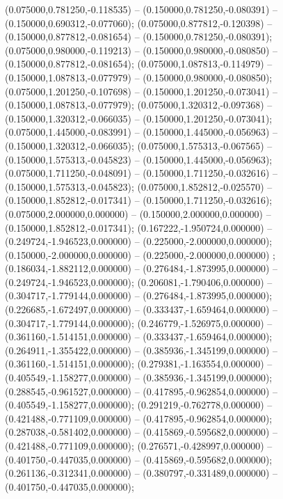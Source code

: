  (0.075000,0.781250,-0.118535) -- (0.150000,0.781250,-0.080391) -- (0.150000,0.690312,-0.077060);
 (0.075000,0.877812,-0.120398) -- (0.150000,0.877812,-0.081654) -- (0.150000,0.781250,-0.080391);
 (0.075000,0.980000,-0.119213) -- (0.150000,0.980000,-0.080850) -- (0.150000,0.877812,-0.081654);
 (0.075000,1.087813,-0.114979) -- (0.150000,1.087813,-0.077979) -- (0.150000,0.980000,-0.080850);
 (0.075000,1.201250,-0.107698) -- (0.150000,1.201250,-0.073041) -- (0.150000,1.087813,-0.077979);
 (0.075000,1.320312,-0.097368) -- (0.150000,1.320312,-0.066035) -- (0.150000,1.201250,-0.073041);
 (0.075000,1.445000,-0.083991) -- (0.150000,1.445000,-0.056963) -- (0.150000,1.320312,-0.066035);
 (0.075000,1.575313,-0.067565) -- (0.150000,1.575313,-0.045823) -- (0.150000,1.445000,-0.056963);
 (0.075000,1.711250,-0.048091) -- (0.150000,1.711250,-0.032616) -- (0.150000,1.575313,-0.045823);
 (0.075000,1.852812,-0.025570) -- (0.150000,1.852812,-0.017341) -- (0.150000,1.711250,-0.032616);
 (0.075000,2.000000,0.000000) -- (0.150000,2.000000,0.000000) -- (0.150000,1.852812,-0.017341);
 (0.167222,-1.950724,0.000000) -- (0.249724,-1.946523,0.000000) -- (0.225000,-2.000000,0.000000);
 (0.150000,-2.000000,0.000000) -- (0.225000,-2.000000,0.000000) ;
 (0.186034,-1.882112,0.000000) -- (0.276484,-1.873995,0.000000) -- (0.249724,-1.946523,0.000000);
 (0.206081,-1.790406,0.000000) -- (0.304717,-1.779144,0.000000) -- (0.276484,-1.873995,0.000000);
 (0.226685,-1.672497,0.000000) -- (0.333437,-1.659464,0.000000) -- (0.304717,-1.779144,0.000000);
 (0.246779,-1.526975,0.000000) -- (0.361160,-1.514151,0.000000) -- (0.333437,-1.659464,0.000000);
 (0.264911,-1.355422,0.000000) -- (0.385936,-1.345199,0.000000) -- (0.361160,-1.514151,0.000000);
 (0.279381,-1.163554,0.000000) -- (0.405549,-1.158277,0.000000) -- (0.385936,-1.345199,0.000000);
 (0.288545,-0.961527,0.000000) -- (0.417895,-0.962854,0.000000) -- (0.405549,-1.158277,0.000000);
 (0.291219,-0.762778,0.000000) -- (0.421488,-0.771109,0.000000) -- (0.417895,-0.962854,0.000000);
 (0.287038,-0.581402,0.000000) -- (0.415869,-0.595682,0.000000) -- (0.421488,-0.771109,0.000000);
 (0.276571,-0.428997,0.000000) -- (0.401750,-0.447035,0.000000) -- (0.415869,-0.595682,0.000000);
 (0.261136,-0.312341,0.000000) -- (0.380797,-0.331489,0.000000) -- (0.401750,-0.447035,0.000000);
